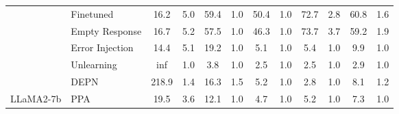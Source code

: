 \begin{table}[t]
{\begin{tabular}{ll|cc|cccccccc}
\multicolumn{1}{c|}{}                                                    & Finetuned                                                   & 16.2                                  & 5.0                                                         & 59.4              & 1.0               & 50.4              & 1.0               & 72.7              & 2.8                & 60.8                & 1.6                 \\ \cline{2-12} 
\multicolumn{1}{c|}{}                                                    & Empty Response                                              & 16.7                                  & 5.2                                                         & 57.5              & 1.0               & 46.3              & 1.0               & 73.7              & 3.7                & 59.2                & 1.9                 \\
\multicolumn{1}{c|}{}                                                    & Error Injection                                             & 14.4                                  & 5.1                                                         & 19.2              & 1.0               & 5.1               & 1.0               & 5.4               & 1.0                & 9.9                 & 1.0                 \\
\multicolumn{1}{c|}{}                                                    & Unlearning                                                  & inf                                   & 1.0                                                         & 3.8               & 1.0               & 2.5               & 1.0               & 2.5               & 1.0                & 2.9                 & 1.0                 \\
\multicolumn{1}{c|}{}                                                    & DEPN                                                        & 218.9                                 & 1.4                                                         & 16.3              & 1.5               & 5.2               & 1.0               & 2.8               & 1.0                & 8.1                 & 1.2                 \\
\multicolumn{1}{c|}{\multirow{-7}{*}{LLaMA2-7b}}                         & \cellcolor[HTML]{EFEFEF}PPA                                 & \cellcolor[HTML]{EFEFEF}19.5          & \cellcolor[HTML]{EFEFEF}3.6                                  & \cellcolor[HTML]{EFEFEF}12.1 & \cellcolor[HTML]{EFEFEF}1.0 & \cellcolor[HTML]{EFEFEF}4.7 & \cellcolor[HTML]{EFEFEF}1.0 & \cellcolor[HTML]{EFEFEF}5.2 & \cellcolor[HTML]{EFEFEF}1.0  & \cellcolor[HTML]{EFEFEF}7.3  & \cellcolor[HTML]{EFEFEF}1.0  \\ \hline

\end{tabular}}
\end{table}
